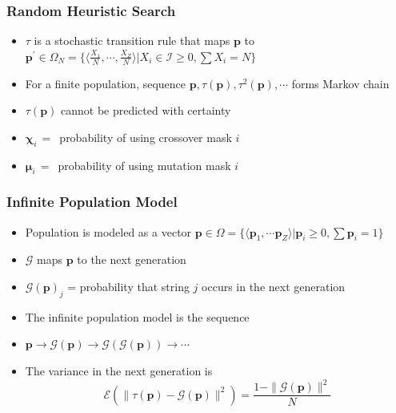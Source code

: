 \documentclass[aspectratio=169]{beamer}
\begin{document}
  \begin{frame}
    \frametitle{Random Heuristic Search}
    \begin{itemize}
      \item{$\tau$ is a stochastic transition rule that maps 
      $\bm{p}$ to $\bm{p^\prime} \in \Omega_N = \{\langle \frac{X_1}{N},\cdots,\frac{X_Z}{N} \rangle |X_i \in \mathcal{I} \geq 0, \sum X_i = N\}$}
      \item{For a finite population, sequence $\bm{p}, \tau(\bm{p}), \tau^2(\bm{p}), \cdots $ forms Markov chain}
      \item{$\tau(\bm{p})$ cannot be predicted with certainty }      
      \item{$\bm{\chi}_i \,=\,$ probability of using crossover mask $i$ }
      \item{$\bm{\mu}_i \,=\,$ probability of using mutation mask $i$ }
    \end{itemize}
  \end{frame}
  
  \begin{frame}
    \frametitle{Infinite Population Model}
    \begin{itemize}
      \item{Population is modeled as a vector $\bm{p} \in \Omega = \{\langle \bm{p}_1, \cdots \bm{p}_Z \rangle | \bm{p}_i \geq 0, \sum \bm{p}_i = 1 \}$}
      \item{$\mathcal{G}$ maps $\bm{p}$ to the next generation}
      \item{$\mathcal{G}(\bm{p})_j$ =  probability that string $j$ occurs in the next generation}
      \item{The infinite population model is the sequence }
      \item{$\bm{p} \to \mathcal{G}(\bm{p}) \to  {\mathcal{G}}(\mathcal{G}(\bm{p})) \to \cdots $}
      \item{The variance in the next generation  is
	\[\mathcal{E}(\| \tau (\bm{p}) - \mathcal{G}(\bm{p}) \|^2) = \frac{1 - \|\mathcal{G}(\bm{p})\|^2}{N}\]
      }
    \end{itemize}  
  \end{frame}  
  
\end{document}
